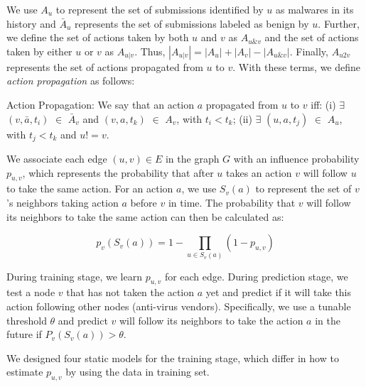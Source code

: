 We use $A_u$ to represent the set of submissions identified by $u$ as malwares in its history
and $\bar{A}_u$ represents the set of submissions labeled as benign by $u$.
Further, we define the set of actions taken by both $u$ and $v$ as $A_{u\&v}$ 
and the set of actions taken by either $u$ or $v$ as $A_{u|v}$.
Thus, $|A_{u|v}| =   |A_u| + |A_v| - |A_{u\&v}|$.
Finally, $A_{u2v}$ represents the set of actions propagated from $u$ to $v$. 
With these terms, we define {\em action propagation} as follows: 

\begin{definition}{Action Propagation:}
We say that an action $a$ propagated from $u$ to $v$ iff: (i) $\exists$ $(v, \bar{a}, t_i)$ $\in$ $\bar{A}_v$ 
and $(v, a, t_k)$ $\in$ $A_v$, with $t_i < t_k$; (ii) $\exists$ $(u, a, t_j)$ $\in$ $A_u$, with $t_j < t_k$ and $u != v$. 
\end{definition}

We associate each edge $(u, v) \in E$ in the graph $G$ 
with an influence probability $p_{u,v}$,
which represents the probability that after $u$ takes an action $v$ will follow $u$ to take the same action. 
For an action $a$, we use $S_v(a)$ to represent the set of $v$'s neighbors taking action $a$ before $v$ in time. 
The probability that $v$ will follow its neighbors to take the same action can then be calculated as:

\begin{equation} \label{eq:setp}
p_v(S_v(a)) = 1 - \prod\limits_{u \in S_v(a)}(1 - p_{u,v})
\end{equation}

During training stage, we learn $p_{u,v}$ for each edge. 
During prediction stage, we test a node $v$ that has not taken the action $a$ yet
and predict if it will take this action following other nodes (anti-virus vendors). 
Specifically, we use a tunable threshold $\theta$
and predict $v$ will follow its neighbors to take the action $a$ in the future
if $P_v(S_v(a))>\theta$.

We designed four static models for the training stage, which differ in how to estimate $p_{u,v}$ by using the data in training set. 


